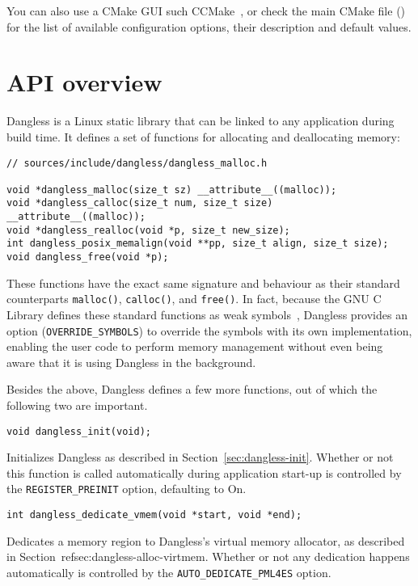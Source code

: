 You can also use a CMake GUI such CCMake~\cite{ccmake-website}, or check the main CMake file () for the list of available configuration options, their description and default values.

\section{API overview}

Dangless is a Linux static library  that can be linked to any application during build time. It defines a set of functions for allocating and deallocating memory:

\begin{lstlisting}
// sources/include/dangless/dangless_malloc.h

void *dangless_malloc(size_t sz) __attribute__((malloc));
void *dangless_calloc(size_t num, size_t size) __attribute__((malloc));
void *dangless_realloc(void *p, size_t new_size);
int dangless_posix_memalign(void **pp, size_t align, size_t size);
void dangless_free(void *p);
\end{lstlisting}

These functions have the exact same signature and behaviour as their standard counterparts \lstinline!malloc()!, \lstinline!calloc()!, and \lstinline!free()!. In fact, because the GNU C Library defines these standard functions as weak symbols~\cite{glibc-malloc-is-weak}, Dangless provides an option (\lstinline!OVERRIDE_SYMBOLS!) to override the symbols with its own implementation, enabling the user code to perform memory management without even being aware that it is using Dangless in the background.

Besides the above, Dangless defines a few more functions, out of which the following two are important.

\begin{lstlisting}
void dangless_init(void);
\end{lstlisting}

Initializes Dangless as described in Section~\ref{sec:dangless-init}. Whether or not this function is called automatically during application start-up is controlled by the \lstinline!REGISTER_PREINIT! option, defaulting to On.

\begin{lstlisting}
int dangless_dedicate_vmem(void *start, void *end);
\end{lstlisting}

Dedicates a memory region to Dangless's virtual memory allocator, as described in Section~ref{sec:dangless-alloc-virtmem}.
Whether or not any dedication happens automatically is controlled by the \lstinline!AUTO_DEDICATE_PML4ES! option.

